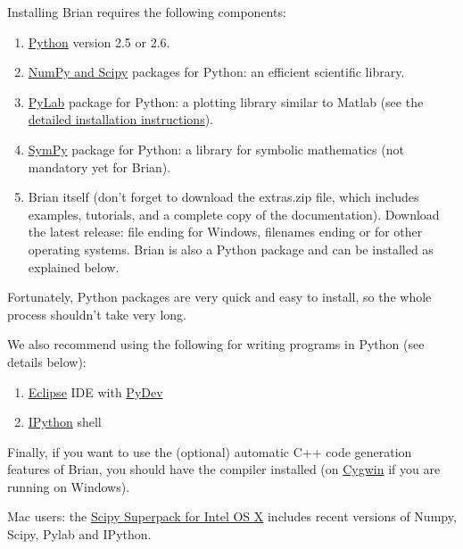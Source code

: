 \documentclass[letterpaper,10pt]{manual}
\begin{document}
Installing Brian requires the following components:
\begin{enumerate}
\item {} 
\href{http://www.python.org/download/}{Python} version 2.5 or 2.6.

\item {} 
\href{http://www.scipy.org/Download}{NumPy and Scipy} packages for Python:
an efficient scientific library.

\item {} 
\href{http://matplotlib.sourceforge.net/}{PyLab} package for Python:
a plotting library similar to Matlab
(see the \href{http://matplotlib.sourceforge.net/installing.html}{detailed installation instructions}).

\item {} 
\href{http://code.google.com/p/sympy/}{SymPy} package for Python:
a library for symbolic mathematics (not mandatory yet for Brian).

\item {} 
Brian itself (don't forget to download the extras.zip file,
which includes examples, tutorials, and a complete copy of the documentation).
Download the latest release: file ending  for Windows,
filenames ending  or  for other operating systems.
Brian is also a Python package and can be installed as explained below.

\end{enumerate}

Fortunately, Python packages are very quick and easy to install, so the whole process shouldn't
take very long.

We also recommend using the following for writing programs in Python (see details below):
\begin{enumerate}
\item {} 
\href{http://www.eclipse.org/}{Eclipse} IDE with \href{http://pydev.sourceforge.net/}{PyDev}

\item {} 
\href{http://ipython.scipy.org/moin/}{IPython} shell

\end{enumerate}

Finally, if you want to use the (optional) automatic C++ code generation features of Brian, you should
have the  compiler installed (on \href{http://www.cygwin.com/}{Cygwin} if you are
running on Windows).

Mac users: the \href{http://trichech.us/?page\_id=5}{Scipy Superpack for Intel OS X} includes
recent versions of Numpy, Scipy, Pylab and IPython.
\end{document}
